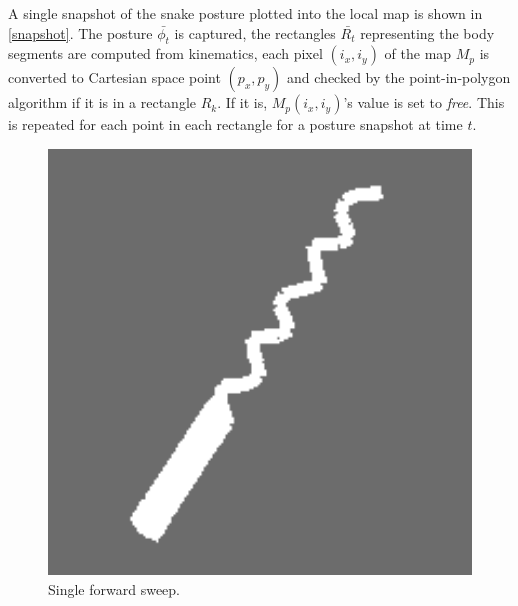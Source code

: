 A single snapshot of the snake posture plotted into the local map is shown in \autoref{snapshot}. The posture $\bar{\phi_t}$ is captured, the rectangles $\bar{R_t}$ representing the body segments are computed from kinematics, each pixel $(i_x,i_y)$ of the map $M_p$ is converted to Cartesian space point $(p_x,p_y)$ and checked by the point-in-polygon algorithm if it is in a rectangle $R_k$. If it is, $M_p(i_x,i_y)$'s value is set to \emph{free}. This is repeated for each point in each rectangle for a posture snapshot at time $t$.

\begin{figure}[htbp]
\centering
\includegraphics[keepaspectratio,width=400pt,height=0.75\textheight]{localOccMapSingle0.png}
\caption{Single forward sweep.}
\label{single_sweep}
\end{figure}



